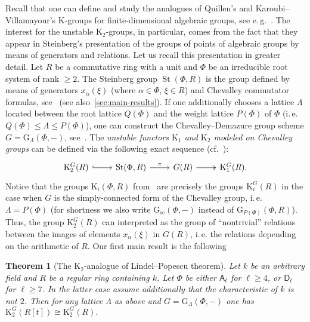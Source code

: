 \documentclass[oneside, 11pt]{amsart} \pdfoutput=1
\newcommand{\K}{{\mathrm{K}}}
\newcommand{\St}{\mathop{\mathrm{St}}\nolimits}
\newcommand{\Gsc}{\mathrm{G}_\mathrm{sc}}
\numberwithin{equation}{section}
\newtheorem{theorem}[lemma]{Theorem}
\theoremstyle{definition}
\newcommand{\rA}{\mathsf{A}}
\newcommand{\rD}{\mathsf{D}}
\begin{document}
Recall that one can define and study the analogues of Quillen's and Karoubi--Villamayour's $\K$-groups for finite-dimensional algebraic groups, see e.\,g.~\cite{St71, Re75, St78, Su82, Tu83, Abe83, Jar83, Pa89, Sta14, VW16, Sta20}. The interest for the unstable $\K_2$-groups, in particular, comes from the fact that they appear in Steinberg's presentation of the groups of points of algebraic groups by means of generators and relations. Let us recall this presentation in greater detail. Let $R$ be a commutative ring with a unit and $\Phi$ be an irreducible root system of rank $\geq 2$. The Steinberg group $\St(\Phi, R)$ is the group defined by means of generators $x_\alpha(\xi)$ (where $\alpha\in\Phi$, $\xi\in R$) and Chevalley commutator formulas, see~\cite[Ch.~6]{St67} (see also~\cref{sec:main-results}).
If one additionally chooses a lattice $\Lambda$ located between the root lattice $Q(\Phi)$ and the weight lattice $P(\Phi)$ of $\Phi$ (i.\,e. $Q(\Phi) \leq \Lambda \leq P(\Phi)$), one can construct the Chevalley--Demazure group scheme $G = \mathrm{G}_\Lambda(\Phi, -)$, see~\cite[\S~3]{St67}. The {\it unstable functors $\K_1$ and $\K_2$ modeled on Chevalley groups} can be defined via the following exact sequence (cf.~\cite{St78}):
\begin{equation} \label{eq:main-exactSeq} \begin{tikzcd} \K_2^G(R) \ar[hookrightarrow]{r} & \St(\Phi, R) \ar{r}{\pi} & G(R) \ar[twoheadrightarrow]{r} & \K_1^G(R). \end{tikzcd} \end{equation}
Notice that the groups $\K_i(\Phi, R)$ from~\cite{St78} are precisely the groups $\K_i^G(R)$ in the case when $G$ is the simply-connected form of the Chevalley group, i.\,e. $\Lambda = P(\Phi)$ (for shortness we also write $\Gsc(\Phi,-)$ instead of $\mathrm{G}_{P(\Phi)}(\Phi, R)$). 
Thus, the group $\K_2^G(R)$ can interpreted as the group of ``nontrivial'' relations between the images of elements $x_\alpha(\xi)$ in $G(R)$, i.\,e. the relations depending on the arithmetic of $R$. Our first main result is the following
\begin{theorem}[The $\K_2$-analogue of Lindel--Popescu theorem] \label{theorem:LP-for-K2}
Let $k$ be an arbitrary field and $R$ be a regular ring containing $k$. Let $\Phi$ be either $\rA_\ell$ for $\ell\geq4$, or $\rD_\ell$ for $\ell\geq 7$. In the latter case assume additionally that the characteristic of $k$ is not $2$. Then for any lattice $\Lambda$ as above and $G = \mathrm{G}_\Lambda(\Phi, -)$ one has $\K_2^G(R[t])\cong\K_2^G(R).$
\end{theorem} 
\end{document}
